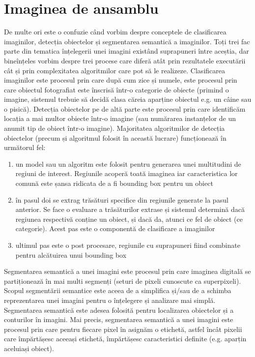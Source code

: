 \section{Imaginea de ansamblu}
De multe ori este o confuzie când vorbim despre conceptele de clasificarea imaginilor, detecția obiectelor și segmentarea semantică a imaginilor. Toți trei fac parte din tematica înțelegerii unei imagini existând suprapuneri între aceștia, dar bineînțeles vorbim despre trei procese care diferă atât prin rezultatele executării cât și prin complexitatea algoritmilor care pot să le realizeze.\newline
Clasificarea imaginilor este procesul prin care după cum zice și numele, este procesul prin care obiectul fotografiat este înscrisă într-o categorie de obiecte (primind o imagine, sistemul trebuie să decidă clasa căreia aparține obiectul e.g. un câine sau o pisică).\newline
Detecția obiectelor pe de altă parte este procesul prin care identificăm locația a mai multor obiecte într-o imagine (sau numărarea instanțelor de un anumit tip de obiect într-o imagine). Majoritatea algoritmilor de detecția obiectelor (precum și algoritmul folosit în această lucrare) funcționează în următorul fel:
\begin{enumerate}
	\item un model sau un algoritm este folosit pentru generarea unei multitudini de regiuni de interest. Regiunile acoperă toată imaginea iar caracteristica lor comună este șansa ridicata de a fi bounding box pentru un obiect
	\item în pasul doi se extrag trăsături specifice din regiunile generate la pasul anterior. Se face o evaluare a trăsăturilor extrase și sistemul determină dacă regiunea respectivă conține un obiect, și dacă da, atunci ce fel de obiect (ce categorie). Acest pas este o componentă de clasificare a imaginilor
	\item ultimul pas este o post procesare, regiunile cu suprapuneri fiind combinate pentru alcătuirea unui bounding box
\end{enumerate}
Segmentarea semantică a unei imagini este procesul prin care imaginea digitală se partiționează în mai multi segmenți (seturi de pixeli cunoscute ca superpixeli). Scopul segmentării semantice este aceea de a simplifica și/sau de a schimba reprezentarea unei imagini pentru o înțelegere și analizare mai simplă. Segmentarea semantică este adesea folosită pentru localizarea obiectelor și a conturilor în imagini. Mai precis, segmentarea semantică a unei imagini este procesul prin care pentru fiecare pixel în asignăm o etichetă, astfel încât pixelii care împărtășesc aceeași etichetă, împărtășesc caracteristici definite (e.g. aparțin aceluiași obiect).


